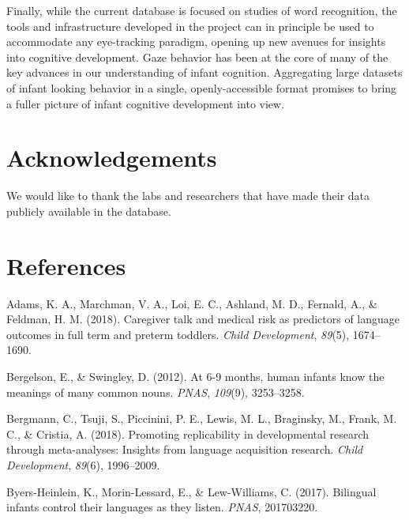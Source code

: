 \documentclass[10pt, letterpaper]{article}
\begin{document}
Finally, while the current database is focused on studies of word
recognition, the tools and infrastructure developed in the project can
in principle be used to accommodate any eye-tracking paradigm, opening
up new avenues for insights into cognitive development. Gaze behavior
has been at the core of many of the key advances in our understanding of
infant cognition. Aggregating large datasets of infant looking behavior
in a single, openly-accessible format promises to bring a fuller picture
of infant cognitive development into view.

\hypertarget{acknowledgements}{%
\section{Acknowledgements}\label{acknowledgements}}

We would like to thank the labs and researchers that have made their
data publicly available in the database.

\hypertarget{references}{%
\section{References}\label{references}}

\setlength{\parindent}{-0.1in} 
\setlength{\leftskip}{0.125in}

\noindent

\hypertarget{refs}{}
\leavevmode\hypertarget{ref-Adams2018}{}%
Adams, K. A., Marchman, V. A., Loi, E. C., Ashland, M. D., Fernald, A.,
\& Feldman, H. M. (2018). Caregiver talk and medical risk as predictors
of language outcomes in full term and preterm toddlers. \emph{Child
Development}, \emph{89}(5), 1674--1690.

\leavevmode\hypertarget{ref-Bergelson2012a}{}%
Bergelson, E., \& Swingley, D. (2012). At 6-9 months, human infants know
the meanings of many common nouns. \emph{PNAS}, \emph{109}(9),
3253--3258.

\leavevmode\hypertarget{ref-Bergmann2018}{}%
Bergmann, C., Tsuji, S., Piccinini, P. E., Lewis, M. L., Braginsky, M.,
Frank, M. C., \& Cristia, A. (2018). Promoting replicability in
developmental research through meta-analyses: Insights from language
acquisition research. \emph{Child Development}, \emph{89}(6),
1996--2009.

\leavevmode\hypertarget{ref-Byers-Heinlein2017}{}%
Byers-Heinlein, K., Morin-Lessard, E., \& Lew-Williams, C. (2017).
Bilingual infants control their languages as they listen. \emph{PNAS},
201703220.
\end{document}

